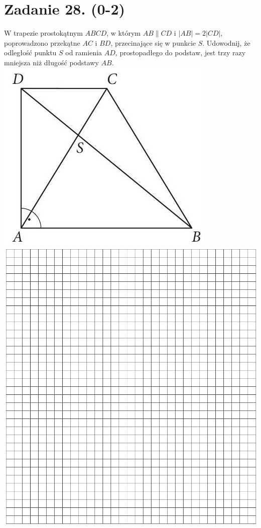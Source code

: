 \documentclass[10pt]{article}
\begin{document}
\section*{Zadanie 28. (0-2)}
W trapezie prostokątnym \(A B C D\), w którym \(A B \| C D\) i \(|A B|=2|C D|\), poprowadzono przekątne \(A C\) i \(B D\), przecinające się w punkcie \(S\). Udowodnij, że odległość punktu \(S\) od ramienia \(A D\), prostopadłego do podstaw, jest trzy razy mniejsza niż długość podstawy \(A B\).\\
\includegraphics[max width=\textwidth, center]{2024_11_21_72158d4a4efa7dd894bcg-16}\\
\includegraphics[max width=\textwidth, center]{2024_11_21_72158d4a4efa7dd894bcg-16(1)}
\end{document}
